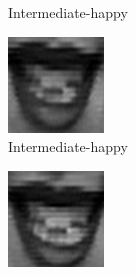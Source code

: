 \begin{figure}
\begin{subfigure}[b]{0.15\textwidth}
		\caption{Intermediate-happy}
		\label{fig:timeseriesHappy:e}
	\end{subfigure}
	\begin{subfigure}[b]{0.15\textwidth}
		\includegraphics[width=\textwidth]{./img/timeseriesHappy/S026_006_00000006.png}
		\caption{Intermediate-happy}
		\label{fig:timeseriesHappy:f}
	\end{subfigure}
	\begin{subfigure}[b]{0.15\textwidth}
		\includegraphics[width=\textwidth]{./img/timeseriesHappy/S026_006_00000007.png}

\end{subfigure}
\end{figure}
